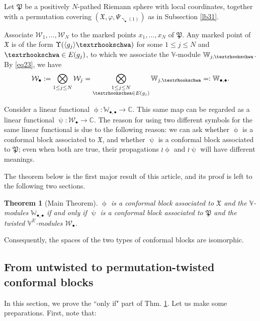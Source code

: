 \documentclass[12pt,a4paper,notitlepage]{article}
\theoremstyle{definition}
\theoremstyle{plain}
\newtheorem{thm}[df]{Theorem}
\newcommand{\fk}{\mathfrak}
\newcommand{\mc}{\mathcal}
\newcommand{\bk}[1]{\langle {#1}\rangle}
\newcommand{\blt}{\bullet}
\newcommand{\Vbb}{\mathbb V}
\newcommand{\Wbb}{\mathbb W}
\newcommand{\Cbb}{\mathbb C}
\newcommand{\tipae}{\text{\textrhookschwa}}
\numberwithin{equation}{subsection}
\begin{document}
Let $\fk P$ be a positively $N$-pathed Riemann sphere with local coordinates, together with a permutation covering $(\fk X,\varphi,\Psi_{\upgamma_\blt(1)})$ as in Subsection \ref{lb31}.

Associate $\mc W_1,\dots,\mc W_N$ to the marked points $x_1,\dots,x_N$ of $\fk P$. Any marked point of $\fk X$ is of the form $\Upsilon(\bk{g_j}\tipae)$ for some $1\leq j\leq N$ and $\tipae\in E(g_j)$, to which we associate the $\Vbb$-module $\Wbb_{j,\tipae}$. By \eqref{eq23}, we have
\begin{align*}
	\mc W_\blt:=\bigotimes_{1\leq j\leq N}\mc W_j=\bigotimes_{\begin{subarray}{c}
			1\leq j\leq N\\	
			\tipae\in E(g_j)
	\end{subarray}}\Wbb_{j,\tipae}=:\Wbb_{\blt,\blt}.
\end{align*}

Consider a linear functional $\upphi:\Wbb_{\blt,\blt}\rightarrow\Cbb$. This same map can be regarded as a linear functional $\uppsi:\mc W_\blt\rightarrow\Cbb$. The reason for using two different symbols for the same linear functional is due to the following reason: we can ask whether $\upphi$ is a conformal block associated to $\fk X$, and whether $\uppsi$ is a conformal block associated to $\fk P$; even when both are true, their propagations $\wr\upphi$ and $\wr\uppsi$ will have different meanings.


The theorem below is the first major result of this article, and its proof is left to the following two sections.

\begin{thm}[Main Theorem]\label{lb14}
$\upphi$ is a conformal block associated to $\fk X$ and the $\Vbb$-modules $\Wbb_{\blt,\blt}$ if and only if $\uppsi$ is a conformal block associated to $\fk P$ and the twisted $\Vbb^E$-modules $\mc W_\blt$.
\end{thm}


Consequently, the spaces of the two types of conformal blocks are isomorphic.



\subsection{From untwisted to permutation-twisted conformal blocks}\label{lb1}






In this section, we prove the ``only if" part of Thm. \ref{lb14}. Let us  make some preparations. First, note that:
\end{document}
